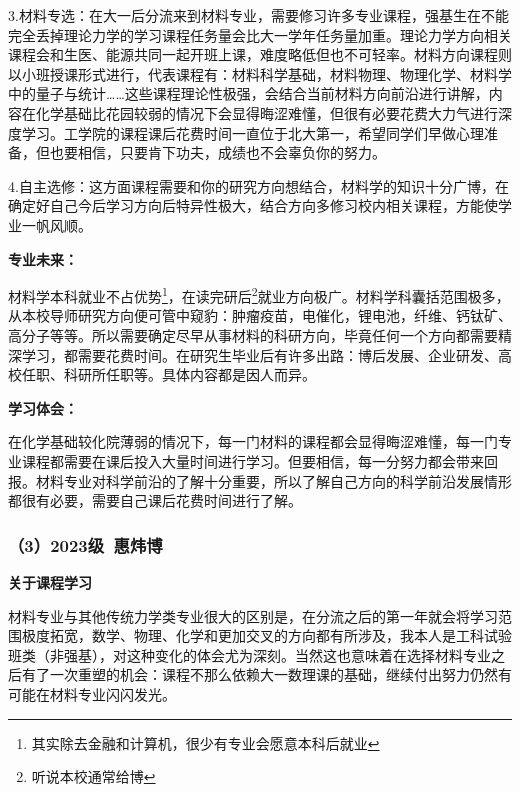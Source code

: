 \documentclass[11pt,oneside]{book}
\begin{document}
3.材料专选：在大一后分流来到材料专业，需要修习许多专业课程，强基生在不能完全丢掉理论力学的学习课程任务量会比大一学年任务量加重。理论力学方向相关课程会和生医、能源共同一起开班上课，难度略低但也不可轻率。材料方向课程则以小班授课形式进行，代表课程有：材料科学基础，材料物理、物理化学、材料学中的量子与统计……这些课程理论性极强，会结合当前材料方向前沿进行讲解，内容在化学基础比花园较弱的情况下会显得晦涩难懂，但很有必要花费大力气进行深度学习。工学院的课程课后花费时间一直位于北大第一，希望同学们早做心理准备，但也要相信，只要肯下功夫，成绩也不会辜负你的努力。

\vspace{10pt}

4.自主选修：这方面课程需要和你的研究方向想结合，材料学的知识十分广博，在确定好自己今后学习方向后特异性极大，结合方向多修习校内相关课程，方能使学业一帆风顺。

\vspace{10pt}

\textbf{专业未来：}

材料学本科就业不占优势\footnote{其实除去金融和计算机，很少有专业会愿意本科后就业}，在读完研后\footnote{听说本校通常给博}就业方向极广。材料学科囊括范围极多，从本校导师研究方向便可管中窥豹：肿瘤疫苗，电催化，锂电池，纤维、钙钛矿、高分子等等。所以需要确定尽早从事材料的科研方向，毕竟任何一个方向都需要精深学习，都需要花费时间。在研究生毕业后有许多出路：博后发展、企业研发、高校任职、科研所任职等。具体内容都是因人而异。

\vspace{10pt}

\textbf{学习体会：}

在化学基础较化院薄弱的情况下，每一门材料的课程都会显得晦涩难懂，每一门专业课程都需要在课后投入大量时间进行学习。但要相信，每一分努力都会带来回报。材料专业对科学前沿的了解十分重要，所以了解自己方向的科学前沿发展情形都很有必要，需要自己课后花费时间进行了解。

\subsubsection{（3）2023级\ 惠炜博}

\textbf{关于课程学习}

材料专业与其他传统力学类专业很大的区别是，在分流之后的第一年就会将学习范围极度拓宽，数学、物理、化学和更加交叉的方向都有所涉及，我本人是工科试验班类（非强基），对这种变化的体会尤为深刻。当然这也意味着在选择材料专业之后有了一次重塑的机会：课程不那么依赖大一数理课的基础，继续付出努力仍然有可能在材料专业闪闪发光。
\end{document}
